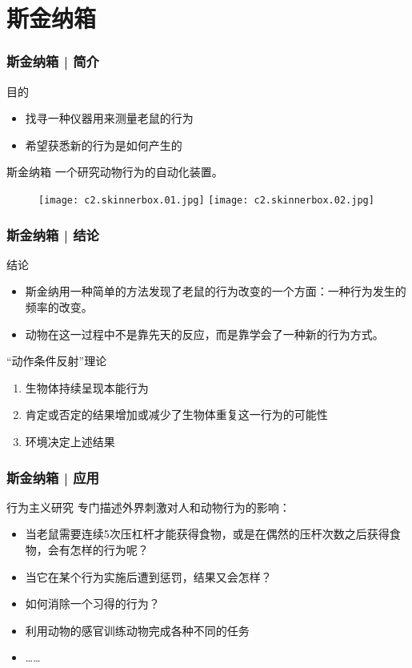 \section{斯金纳箱}
\begin{frame}
  \frametitle{斯金纳箱 | 简介}
  \begin{block}{目的}
    \begin{itemize}
      \item 找寻一种仪器用来测量老鼠的行为
      \item 希望获悉新的行为是如何产生的
    \end{itemize}
  \end{block}
  \pause
  \begin{block}{斯金纳箱}
    一个研究动物行为的自动化装置。
    \vspace{-1em}
  \begin{figure}
    \centering
    \texttt{[image: c2.skinnerbox.01.jpg]}\quad
    \texttt{[image: c2.skinnerbox.02.jpg]}
  \end{figure}
  \end{block}
\end{frame}

\begin{frame}
  \frametitle{斯金纳箱 | 结论}
  \begin{block}{结论}
    \begin{itemize}
      \item 斯金纳用一种简单的方法发现了老鼠的行为改变的一个方面：一种行为发生的频率的改变。
      \item 动物在这一过程中不是靠先天的反应，而是靠学会了一种新的行为方式。
    \end{itemize}
  \end{block}
  \pause
  \begin{block}{“动作条件反射”理论}
    \begin{enumerate}
      \item 生物体持续呈现本能行为
      \item 肯定或否定的结果增加或减少了生物体重复这一行为的可能性
      \item 环境决定上述结果
    \end{enumerate}
  \end{block}
\end{frame}

\begin{frame}
  \frametitle{斯金纳箱 | 应用}
  \begin{block}{行为主义研究}
    专门描述外界刺激对人和动物行为的影响：
    \begin{itemize}
      \item 当老鼠需要连续5次压杠杆才能获得食物，或是在偶然的压杆次数之后获得食物，会有怎样的行为呢？
      \item 当它在某个行为实施后遭到惩罚，结果又会怎样？
      \item 如何消除一个习得的行为？
      \item 利用动物的感官训练动物完成各种不同的任务
      \item ……
    \end{itemize}
  \end{block}
\end{frame}

